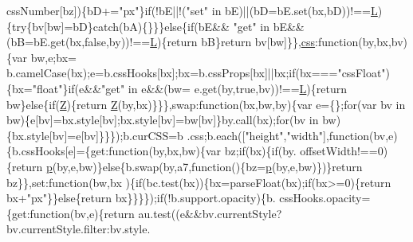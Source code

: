 \begin{DoxyCode}
{      cssNumber[bz])\{bD+=\textcolor{stringliteral}{"px"}\}\textcolor{keywordflow}{if}(!bE||!(\textcolor{stringliteral}{"set"} in bE)||(bD=bE.set(bx,bD))!==\hyperlink{jquery_8js_a38ee4c0b5f4fe2a18d0c783af540d253}{L})\{\textcolor{keywordflow}{try}\{bv[bw]=bD\}\textcolor{keywordflow}{catch}(bA)\{\}\}\}\textcolor{keywordflow}{else}\{\textcolor{keywordflow}{if}(bE&&\textcolor{stringliteral}{
      "get"} in bE&&(bB=bE.get(bx,\textcolor{keyword}{false},by))!==\hyperlink{jquery_8js_a38ee4c0b5f4fe2a18d0c783af540d253}{L})\{\textcolor{keywordflow}{return} bB\}\textcolor{keywordflow}{return} bv[bw]\}\},\hyperlink{jquery_8js_a89ad527fcd82c01ebb587332f5b4fcd4}{css}:\textcolor{keyword}{function}(by,bx,bv)\{var bw,e;bx=
      b.camelCase(bx);e=b.cssHooks[bx];bx=b.cssProps[bx]||bx;\textcolor{keywordflow}{if}(bx===\textcolor{stringliteral}{"cssFloat"})\{bx=\textcolor{stringliteral}{"float"}\}\textcolor{keywordflow}{if}(e&&\textcolor{stringliteral}{"get"} in e&&(bw=
      e.get(by,\textcolor{keyword}{true},bv))!==\hyperlink{jquery_8js_a38ee4c0b5f4fe2a18d0c783af540d253}{L})\{\textcolor{keywordflow}{return} bw\}\textcolor{keywordflow}{else}\{\textcolor{keywordflow}{if}(\hyperlink{jquery_8js_adc18d83abfd9f87d396e8fd6b6ac0fe1}{Z})\{\textcolor{keywordflow}{return} \hyperlink{jquery_8js_adc18d83abfd9f87d396e8fd6b6ac0fe1}{Z}(by,bx)\}\}\},swap:\textcolor{keyword}{function}(bx,bw,by)\{var e=\{\};\textcolor{keywordflow}{for}(var 
      bv in bw)\{e[bv]=bx.style[bv];bx.style[bv]=bw[bv]\}by.call(bx);\textcolor{keywordflow}{for}(bv in bw)\{bx.style[bv]=e[bv]\}\}\});b.curCSS=b
      .css;b.each([\textcolor{stringliteral}{"height"},\textcolor{stringliteral}{"width"}],\textcolor{keyword}{function}(bv,e)\{b.cssHooks[e]=\{\textcolor{keyword}{get}:\textcolor{keyword}{function}(by,bx,bw)\{var bz;\textcolor{keywordflow}{if}(bx)\{\textcolor{keywordflow}{if}(by.
      offsetWidth!==0)\{\textcolor{keywordflow}{return} \hyperlink{jquery_8js_a2335e57f79b6acfb6de59c235dc8a83e}{p}(by,e,bw)\}\textcolor{keywordflow}{else}\{b.swap(by,a7,\textcolor{keyword}{function}()\{bz=\hyperlink{jquery_8js_a2335e57f79b6acfb6de59c235dc8a83e}{p}(by,e,bw)\})\}\textcolor{keywordflow}{return} bz\}\},set:\textcolor{keyword}{function}(bw,bx
      )\{\textcolor{keywordflow}{if}(bc.test(bx))\{bx=parseFloat(bx);\textcolor{keywordflow}{if}(bx>=0)\{\textcolor{keywordflow}{return} bx+\textcolor{stringliteral}{"px"}\}\}\textcolor{keywordflow}{else}\{\textcolor{keywordflow}{return} bx\}\}\}\});\textcolor{keywordflow}{if}(!b.support.opacity)\{b.
      cssHooks.opacity=\{\textcolor{keyword}{get}:\textcolor{keyword}{function}(bv,e)\{\textcolor{keywordflow}{return} au.test((e&&bv.currentStyle?bv.currentStyle.filter:bv.style.
}
\end{DoxyCode}
